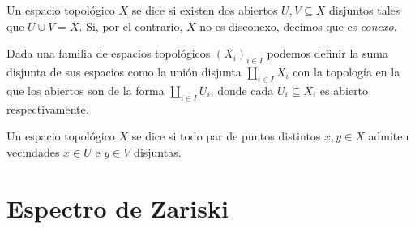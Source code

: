 \documentclass[11pt, reqno]{amsart}
\begin{document}
Un espacio topológico $X$ se dice  si existen dos abiertos $U, V \subseteq X$ disjuntos tales que $U
\cup V = X$.
Si, por el contrario, $X$ no es disconexo, decimos que es \emph{conexo}.

Dada una familia de espacios topológicos $(X_i)_{i\in I}$ podemos definir la suma disjunta de sus espacios como la unión
disjunta $\coprod_{i\in I} X_i$ con la topología en la que los abiertos son de la forma $\coprod_{i\in I} U_i$, donde
cada $U_i \subseteq X_i$ es abierto respectivamente.

Un espacio topológico $X$ se dice  si todo par de puntos distintos $x, y \in X$ admiten vecindades
$x \in U$ e $y \in V$ disjuntas.

\newpage
\section{Espectro de Zariski}
\end{document}
